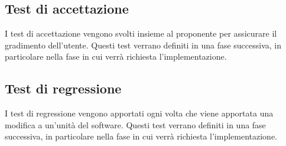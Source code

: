 \subsection{Test di accettazione}
    I test di accettazione vengono svolti insieme al proponente per assicurare il gradimento dell'utente. Questi test verrano definiti in una fase successiva, in particolare nella fase in cui verrà richiesta l'implementazione.
    
\subsection{Test di regressione}
    I test di regressione vengono apportati ogni volta che viene apportata una modifica a un'unità del software. Questi test verrano definiti in una fase successiva, in particolare nella fase in cui verrà richiesta l'implementazione.